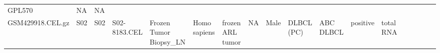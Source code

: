 \documentclass[]{article}
\begin{document}
\begin{longtable}[]{@{}lllllllrllllllllll@{}}
\begin{minipage}[t]{0.01\columnwidth}
GPL570\strut
\end{minipage} & \begin{minipage}[t]{0.00\columnwidth}\raggedright
NA\strut
\end{minipage} & \begin{minipage}[t]{0.01\columnwidth}\raggedright
NA\strut
\end{minipage}\tabularnewline
\begin{minipage}[t]{0.03\columnwidth}\raggedright
GSM429918.CEL.gz\strut
\end{minipage} & \begin{minipage}[t]{0.02\columnwidth}\raggedright
S02\strut
\end{minipage} & \begin{minipage}[t]{0.01\columnwidth}\raggedright
S02\strut
\end{minipage} & \begin{minipage}[t]{0.02\columnwidth}\raggedright
S02-8183.CEL\strut
\end{minipage} & \begin{minipage}[t]{0.06\columnwidth}\raggedright
Frozen Tumor Biopsy\_LN\strut
\end{minipage} & \begin{minipage}[t]{0.02\columnwidth}\raggedright
Homo sapiens\strut
\end{minipage} & \begin{minipage}[t]{0.04\columnwidth}\raggedright
frozen ARL tumor\strut
\end{minipage} & \begin{minipage}[t]{0.05\columnwidth}\raggedleft
NA\strut
\end{minipage} & \begin{minipage}[t]{0.04\columnwidth}\raggedright
Male\strut
\end{minipage} & \begin{minipage}[t]{0.06\columnwidth}\raggedright
DLBCL (PC)\strut
\end{minipage} & \begin{minipage}[t]{0.06\columnwidth}\raggedright
ABC DLBCL\strut
\end{minipage} & \begin{minipage}[t]{0.04\columnwidth}\raggedright
positive\strut
\end{minipage} & \begin{minipage}[t]{0.02\columnwidth}\raggedright
total RNA\strut
\end{minipage} & \begin{minipage}[t]{0.01\columnwidth}\raggedright

\end{minipage}
\end{longtable}
\end{document}
